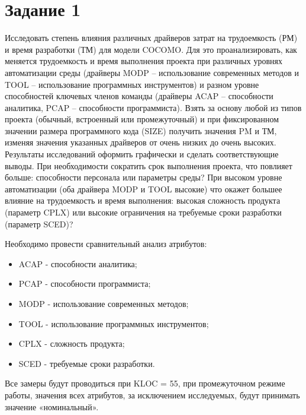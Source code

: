 \section*{Задание 1}
Исследовать степень влияния различных драйверов затрат на трудоемкость (РМ) и время разработки (ТМ) для модели COCOMO. Для это проанализировать, как меняется трудоемкость и время выполнения проекта при различных уровнях автоматизации среды (драйверы MODP – использование современных методов и TOOL – использование программных инструментов) и разном уровне способностей ключевых членов команды (драйверы ACAP – способности аналитика, PCAP – способности программиста). Взять за основу любой из типов проекта (обычный, встроенный или промежуточный) и при фиксированном значении размера программного кода (SIZE) получить значения PM и ТМ, изменяя значения указанных драйверов от очень низких до очень высоких. Результаты исследований оформить графически и сделать соответствующие выводы. При необходимости сократить срок выполнения проекта, что повлияет больше: способности персонала или параметры среды? При высоком уровне автоматизации (оба драйвера MODP и TOOL высокие) что окажет большее влияние на трудоемкость и время выполнения: высокая сложность продукта (параметр CPLX) или высокие ограничения на требуемые сроки разработки (параметр SCED)?

Необходимо провести сравнительный анализ атрибутов:
\begin{itemize}
	\item ACAP - способности аналитика;
	\item PCAP - способности программиста;
	\item MODP - использование современных методов;
	\item TOOL - использование программных инструментов;
	\item CPLX - сложность продукта;
	\item SCED - требуемые сроки разработки.
\end{itemize}

Все замеры будут проводиться при KLOC = 55, при промежуточном режиме работы, значения всех атрибутов, за
исключением исследуемых, будут принимать значение «номинальный».

